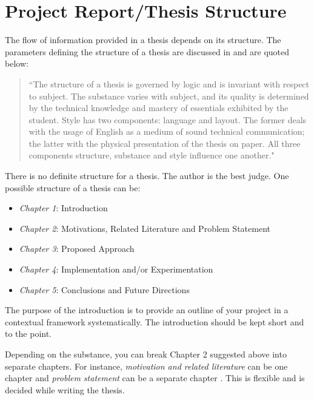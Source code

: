 
\chapter{Project Report/Thesis Structure} %
\label{Chapter1}

The flow of information provided in a thesis depends on its structure. The parameters defining the structure of a thesis are discussed in \cite{getthesis} and are quoted below:  

\begin{quote}
``The structure of a thesis is governed by logic and is invariant with respect to subject. The substance varies with subject, and its quality is determined by the technical knowledge and mastery of essentials exhibited by the student. Style has two components: language and layout. The former deals with the usage of English as a medium of sound technical communication; the latter with the physical presentation of the thesis on paper. All three components structure, substance and style influence one another."
\end{quote}

There is no definite structure for a thesis. The author is the best judge. One possible structure of a thesis can be:

\begin{itemize}
	\item \textit{Chapter 1}: Introduction
	\item \textit{Chapter 2}: Motivations, Related Literature and Problem Statement
	\item \textit{Chapter 3}: Proposed Approach
	\item \textit{Chapter 4}: Implementation and/or Experimentation 
	\item \textit{Chapter 5}: Conclusions and Future Directions 
\end{itemize}

The purpose of the introduction is to provide an outline of your project in a contextual framework systematically. The introduction should be kept short and to the point. 

Depending on the substance, you can break Chapter 2 suggested above into  separate chapters. For instance, \textit{motivation and related literature} can be one chapter and \textit{problem statement} can be a separate chapter . This is flexible and is decided while writing the thesis. 

